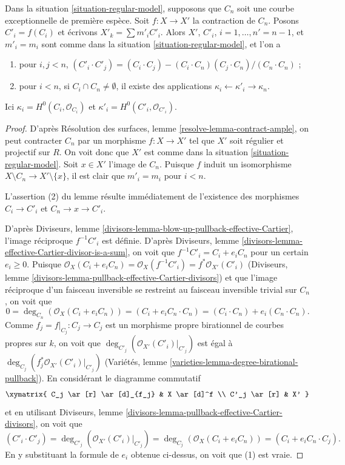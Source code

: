 \begin{lemma}
\label{lemma-blowdown-regular-model}
Dans la situation \ref{situation-regular-model}, supposons que $C_n$ soit
une courbe exceptionnelle de première espèce. Soit $f : X \to X'$ la
contraction de $C_n$. Posons $C'_i = f(C_i)$ et écrivons
$X'_k = \sum m'_iC'_i$. Alors $X'$, $C'_i$, $i = 1, \ldots, n' = n - 1$,
et $m'_i = m_i$ sont comme dans la situation
\ref{situation-regular-model}, et l'on a
\begin{enumerate}
\item pour $i,j<n$,
$(C'_i \cdot C'_j) =
(C_i \cdot C_j) - (C_i \cdot C_n)(C_j \cdot C_n)/(C_n \cdot C_n)$ ;
\item pour $i<n$, si $C_i \cap C_n \not = \emptyset$, il existe des
applications $\kappa_i \leftarrow \kappa'_i \rightarrow \kappa_n$.
\end{enumerate}
Ici $\kappa_i = H^0(C_i, \mathcal{O}_{C_i})$ et
$\kappa'_i = H^0(C'_i, \mathcal{O}_{C'_i})$.
\end{lemma}

\begin{proof}
D'après Résolution des surfaces, lemme
\ref{resolve-lemma-contract-ample}, on peut contracter $C_n$ par un
morphisme $f : X \to X'$ tel que $X'$ soit régulier et projectif sur $R$.
On voit donc que $X'$ est comme dans la situation
\ref{situation-regular-model}. Soit $x \in X'$ l'image de $C_n$.
Puisque $f$ induit un isomorphisme
$X \setminus C_n \to X' \setminus \{x\}$, il est clair que
$m'_i = m_i$ pour $i<n$.

\medskip\noindent
L'assertion (2) du lemme résulte immédiatement de l'existence des
morphismes $C_i \to C'_i$ et $C_n \to x \to C'_i$.

\medskip\noindent
D'après Diviseurs, lemme
\ref{divisors-lemma-blow-up-pullback-effective-Cartier}, l'image réciproque
$f^{-1}C'_i$ est définie. D'après Diviseurs, lemme
\ref{divisors-lemma-effective-Cartier-divisor-is-a-sum}, on voit que
$f^{-1}C'_i = C_i + e_iC_n$ pour un certain $e_i \geq 0$. Puisque
$\mathcal{O}_X(C_i + e_iC_n) = \mathcal{O}_X(f^{-1}C'_i) =
f^*\mathcal{O}_{X'}(C'_i)$
(Diviseurs, lemme \ref{divisors-lemma-pullback-effective-Cartier-divisors})
et que l'image réciproque d'un faisceau inversible se restreint au faisceau
inversible trivial sur $C_n$, on voit que
$$
0 = \deg_{C_n}(\mathcal{O}_X(C_i + e_iC_n)) =
(C_i + e_iC_n \cdot C_n) = (C_i \cdot C_n) + e_i(C_n \cdot C_n).
$$
Comme $f_j = f|_{C_j} : C_j \to C_j$ est un morphisme propre birationnel
de courbes propres sur $k$, on voit que
$\deg_{C'_j}(\mathcal{O}_{X'}(C'_i)|_{C'_j})$ est égal à
$\deg_{C_j}(f_j^*\mathcal{O}_{X'}(C'_i)|_{C'_j})$
(Variétés, lemme \ref{varieties-lemma-degree-birational-pullback}).
En considérant le diagramme commutatif
$$
\xymatrix{
C_j \ar[r] \ar[d]_{f_j} & X \ar[d]^f \\
C'_j \ar[r] & X'
}
$$
et en utilisant Diviseurs, lemme
\ref{divisors-lemma-pullback-effective-Cartier-divisors}, on voit que
$$
(C'_i \cdot C'_j) = \deg_{C'_j}(\mathcal{O}_{X'}(C'_i)|_{C'_j}) =
\deg_{C_j}(\mathcal{O}_X(C_i + e_iC_n)) = (C_i + e_iC_n \cdot C_j).
$$
En y substituant la formule de $e_i$ obtenue ci-dessus, on voit que (1)
est vraie.
\end{proof}

